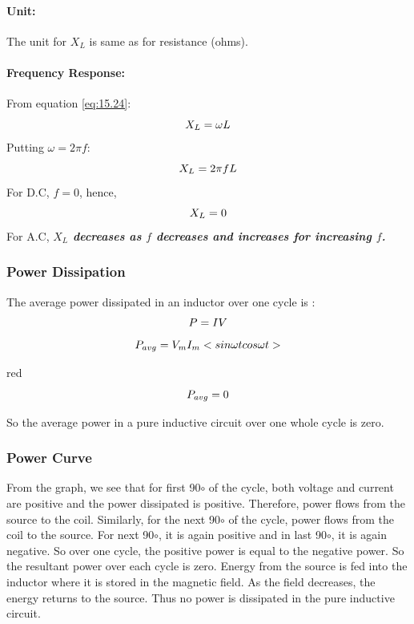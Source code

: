 \paragraph{Unit:}
The unit for $X_{L}$ is same as for resistance (ohms).
\paragraph{Frequency Response:}
From equation \ref{eq:15.24}:
\begin{equation}\notag
    X_{L} = \omega L
\end{equation}
Putting $\omega = 2\pi f$:
\begin{equation}\notag
    X_{L} = 2\pi f L
\end{equation}
For D.C, $f=0$, hence,
\begin{equation}\notag
    X_{L}=0
\end{equation}
For A.C, \textit{\textbf{$X_{L}$ decreases as $f$
decreases and increases for increasing $f$.}}

\subsubsection{Power Dissipation}
The average power dissipated in an inductor over one cycle is :
\begin{equation}\notag
      P=IV
\end{equation}
\begin{equation}\notag
    P_{avg} = V_{m}I_{m}< sin \omega t  cos \omega t>
\end{equation}
\begin{mybox}{red}{}
\begin{equation}\notag
      P_{avg}=0
\end{equation}
\end{mybox}
So the average power in a pure inductive circuit over one whole cycle
is zero.
\subsubsection{Power Curve}
From the graph, we see that for first 90$\circ$ of the cycle,
both voltage and current are positive and the power dissipated is positive. Therefore, power flows from the source to the coil. Similarly, for the next 90$\circ$ of the cycle, power flows from the coil to the source. For next 90$\circ$, it is again positive and in last 90$\circ$, it is again negative. So over one cycle, the positive power is equal to the negative power.
So the resultant power over each cycle is zero.
Energy from the source is fed into the inductor where it is stored
in the magnetic field. As the field decreases, the energy returns
to the source. Thus no power is dissipated in the pure inductive circuit.
